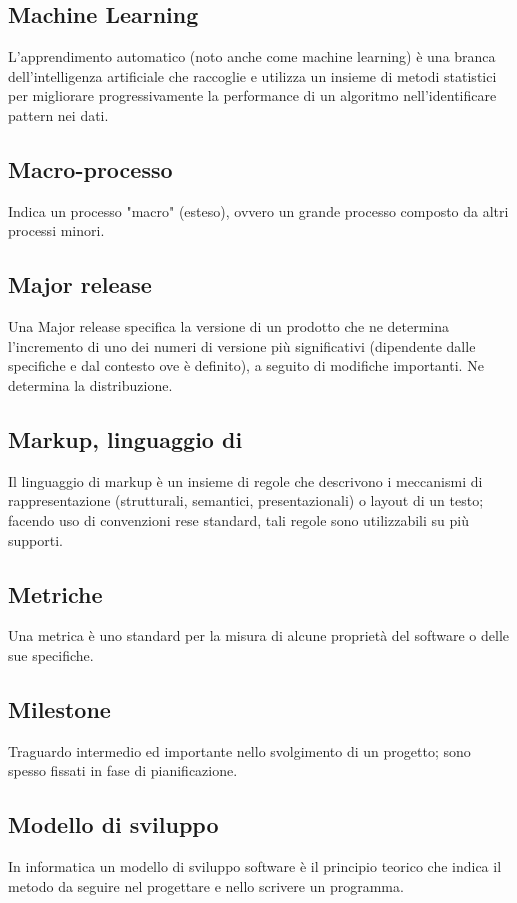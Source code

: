 
\subsection*{Machine Learning}
L’apprendimento automatico (noto anche come machine learning) è una branca dell'intelligenza artificiale che raccoglie e utilizza un insieme di metodi statistici per migliorare progressivamente la performance di un algoritmo nell'identificare pattern nei dati.

\subsection*{Macro-processo}
Indica un processo "macro" (esteso), ovvero un grande processo composto da altri processi minori.

\subsection*{Major release}
Una Major release specifica la versione di un prodotto che ne determina l’incremento di uno dei numeri di versione più significativi (dipendente dalle specifiche e dal contesto ove è definito), a seguito di modifiche importanti. Ne determina la distribuzione.

\subsection*{Markup, linguaggio di}
Il linguaggio di markup è un insieme di regole che descrivono i meccanismi di rappresentazione (strutturali, semantici, presentazionali) o layout di un testo; facendo uso di convenzioni rese standard, tali regole sono utilizzabili su più supporti.

\subsection*{Metriche}
Una metrica è uno standard per la misura di alcune proprietà del software o delle sue specifiche. 

\subsection*{Milestone}
Traguardo intermedio ed importante nello svolgimento di un progetto; sono spesso fissati in fase di pianificazione.

\subsection*{Modello di sviluppo}
In informatica un modello di sviluppo software è il principio teorico che indica il metodo da seguire nel progettare e nello scrivere un programma.


